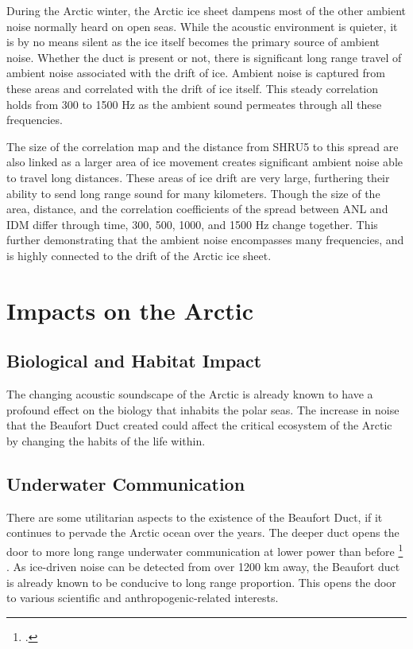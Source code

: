 During the Arctic winter, the Arctic ice sheet dampens most of the other ambient noise normally heard on open seas. While the acoustic environment is quieter, it is by no means silent as the ice itself becomes the primary source of ambient noise.  Whether the duct is present or not, there is significant long range travel of ambient noise associated with the drift of ice. Ambient noise is captured from these areas and correlated with the drift of ice itself. This steady correlation holds from 300 to 1500 Hz as the ambient sound permeates through all these frequencies.

The size of the correlation map and the distance from SHRU5 to this spread are also linked as a larger area of ice movement creates significant ambient noise able to travel long distances. These areas of ice drift are very large, furthering their ability to send long range sound for many kilometers. Though the size of the area, distance, and the correlation coefficients of the spread between ANL and IDM differ through time, 300, 500, 1000, and 1500 Hz change together. This further demonstrating that the ambient noise encompasses many frequencies, and is highly connected to the drift of the Arctic ice sheet.


\section{Impacts on the Arctic}

\subsection{Biological and Habitat Impact}

The changing acoustic soundscape of the Arctic is already known to have a profound effect on the biology that inhabits the polar seas. The increase in noise that the Beaufort Duct created could affect the critical ecosystem of the Arctic by changing the habits of the life within.



\subsection{Underwater Communication}
There are some utilitarian aspects to the existence of the Beaufort Duct, if it continues to pervade the Arctic ocean over the years. The deeper duct opens the door to more long range underwater communication at lower power than before \footcite[]{freitag2015underwatercomms} . As ice-driven noise can be detected from over 1200 km away, the Beaufort duct is already known to be conducive to long range proportion. This opens the door to various scientific and anthropogenic-related interests.

